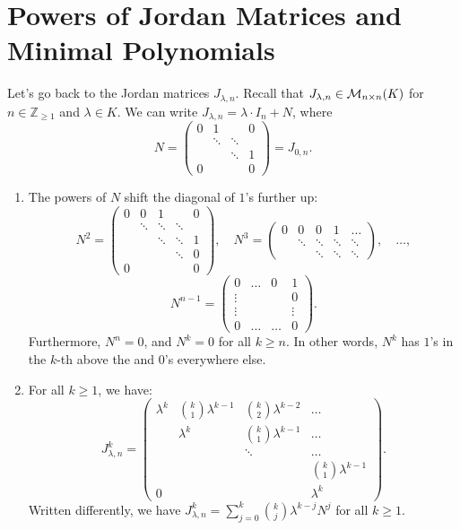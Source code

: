 \section{Powers of Jordan Matrices and Minimal Polynomials}

Let's go back to the Jordan matrices $J_{\lambda, n}$.
Recall that $J_{\lambda, n} \in \mathcal{M}_{n \times n}(K)$ for $n \in \mathbb{Z}_{\ge 1}$ and $\lambda \in K$.
We can write $J_{\lambda, n} = \lambda \cdot I_n + N$, where
\[
N = \begin{pmatrix} 0 & 1 & & 0 \\ & \ddots & \ddots & \\ & & \ddots & 1 \\ 0 & & & 0 \end{pmatrix} = J_{0, n}.
\]

\begin{lemma}
\label{lem:powers_jordan_blocks}
\leavevmode
\begin{enumerate}[label=\textbf{(\alph*)}]
    \item The powers of $N$ shift the diagonal of $1$'s further up:
    \[
    N^2 = \begin{pmatrix} 0 & 0 & 1 & & 0 \\ & \ddots & \ddots & \ddots & \\ & & \ddots & \ddots & 1 \\ & & & \ddots & 0 \\ 0 & & & & 0 \end{pmatrix}, \quad N^3 = \begin{pmatrix} 0 & 0 & 0 & 1 & \dots \\ & \ddots & \ddots & \ddots & \ddots \\ & & \ddots & \ddots & \ddots \end{pmatrix}, \quad \dots, 
    \]
    \[
    N^{n-1} = \begin{pmatrix} 0 & \dots & 0 & 1 \\ \vdots & & & 0 \\ \vdots & & & \vdots \\ 0 & \dots & \dots & 0 \end{pmatrix}.
    \]
    Furthermore, $N^n = 0$, and $N^k = 0$ for all $k \ge n$. In other words, $N^k$ has $1$'s in the $k$-th  above the  and $0$'s everywhere else.
    
    \item For all $k \ge 1$, we have:
    \[
    J_{\lambda, n}^k = \begin{pmatrix} \lambda^k & \binom{k}{1}\lambda^{k-1} & \binom{k}{2}\lambda^{k-2} & \dots \\ & \lambda^k & \binom{k}{1}\lambda^{k-1} & \dots \\ & & \ddots & \dots \\ & & & \binom{k}{1}\lambda^{k-1} \\ 0 & & & \lambda^k \end{pmatrix}.
    \]
    Written differently, we have $J_{\lambda, n}^k = \sum_{j=0}^k \binom{k}{j} \lambda^{k-j} N^j$ for all $k \ge 1$.
\end{enumerate}
\end{lemma}

